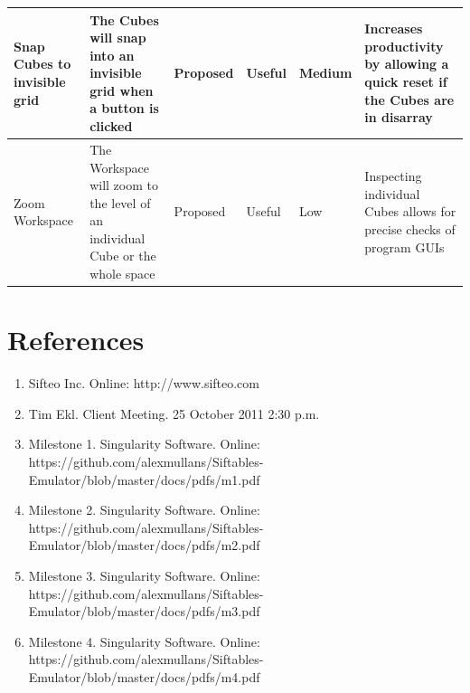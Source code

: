 \documentclass[12pt]{article}
\begin{document}
\begin{landscape}
\begin{table}[h!]
\begin{tabular}{p{1.5in} | p{2.25in} | p{.75in} | p{.75in} | p{.75in} | p{2.25in}}
        Snap Cubes to invisible grid &
        The Cubes will snap into an invisible grid when a button is clicked &
        Proposed &
        Useful &
        Medium &
        Increases productivity by allowing a quick reset if the Cubes are in disarray \\ \hline

        Zoom Workspace &
        The Workspace will zoom to the level of an individual Cube or the whole space &
        Proposed &
        Useful &
        Low &
        Inspecting individual Cubes allows for precise checks of program \glspl{GUI}\index{GUI}\glsadd{GUIa} \\ \hline

      \end{tabular}
    \end{table}
    \end{landscape}

    \clearpage





\clearpage
{}
\printglossaries
\clearpage

\section*{References}

        \begin{enumerate}
                \item{Sifteo Inc. Online: http://www.sifteo.com}
                \item{Tim Ekl.  Client Meeting. 25 October 2011 2:30 p.m.}
                \item{Milestone 1.  Singularity Software.  Online: https://github.com/alexmullans/Siftables-Emulator/blob/master/docs/pdfs/m1.pdf}
                \item{Milestone 2.  Singularity Software.  Online: https://github.com/alexmullans/Siftables-Emulator/blob/master/docs/pdfs/m2.pdf}
                \item{Milestone 3.  Singularity Software.  Online: https://github.com/alexmullans/Siftables-Emulator/blob/master/docs/pdfs/m3.pdf}
                \item{Milestone 4.  Singularity Software.  Online: https://github.com/alexmullans/Siftables-Emulator/blob/master/docs/pdfs/m4.pdf}

        \end{enumerate}

\clearpage

\printindex
\end{document}
